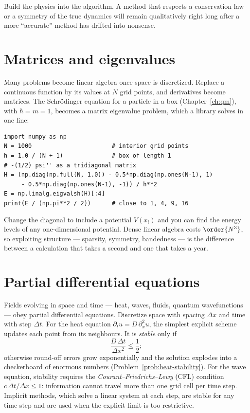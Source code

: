 \begin{keyidea}
Build the physics into the algorithm. A method that respects a conservation law or a symmetry of the true dynamics will remain qualitatively right long after a more ``accurate'' method has drifted into nonsense.
\end{keyidea}

\section{Matrices and eigenvalues}

Many problems become linear algebra once space is discretized. Replace a continuous function by its values at $N$ grid points, and derivatives become matrices. The Schr\"odinger equation for a particle in a box (Chapter~\ref{ch:qm}), with $\hbar = m = 1$, becomes a matrix eigenvalue problem, which a library solves in one line:

\begin{lstlisting}
import numpy as np
N = 1000                       # interior grid points
h = 1.0 / (N + 1)              # box of length 1
# -(1/2) psi'' as a tridiagonal matrix
H = (np.diag(np.full(N, 1.0)) - 0.5*np.diag(np.ones(N-1), 1)
     - 0.5*np.diag(np.ones(N-1), -1)) / h**2
E = np.linalg.eigvalsh(H)[:4]
print(E / (np.pi**2 / 2))      # close to 1, 4, 9, 16
\end{lstlisting}

Change the diagonal to include a potential $V(x_i)$ and you can find the energy levels of any one-dimensional potential. Dense linear algebra costs $\order{N^3}$, so exploiting structure --- sparsity, symmetry, bandedness --- is the difference between a calculation that takes a second and one that takes a year.

\section{Partial differential equations}

Fields evolving in space and time --- heat, waves, fluids, quantum wavefunctions --- obey partial differential equations. Discretize space with spacing $\Delta x$ and time with step $\Delta t$. For the heat equation $\partial_t u = D\,\partial_x^2u$, the simplest explicit scheme updates each point from its neighbours. It is \emph{stable} only if
\[
  \frac{D\,\Delta t}{\Delta x^2}\le\frac12 ;
\]
otherwise round-off errors grow exponentially and the solution explodes into a checkerboard of enormous numbers (Problem~\ref{prob:heat-stability}). For the wave equation, stability requires the \emph{Courant--Friedrichs--Lewy} (CFL) condition $c\,\Delta t/\Delta x\le1$: information cannot travel more than one grid cell per time step. Implicit methods, which solve a linear system at each step, are stable for any time step and are used when the explicit limit is too restrictive.

